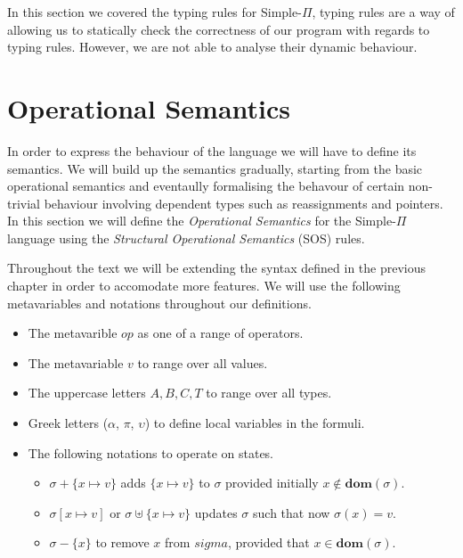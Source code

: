\documentclass[a4paper,12pt]{report}
\begin{document}
\par
In this section we covered the typing rules for Simple-$\Pi$, typing rules are a 
way of allowing us to statically check the correctness of our program with 
regards to typing rules. However, we are not able to analyse their dynamic 
behaviour. 

\newpage 

\section{Operational Semantics}
In order to express the behaviour of the language we will have to define its semantics. 
We will build up the semantics gradually, starting from the basic 
operational semantics and eventaully formalising the behavour of certain 
non-trivial behaviour involving dependent types such as reassignments and 
pointers. In this section we will define the \textit{Operational Semantics} 
\cite{operationalSemantics} for the Simple-$\Pi$ language 
using the \textit{Structural Operational Semantics} \cite{plotkinSOS} (SOS) rules.

\par
Throughout the text we will be extending the syntax defined in the 
previous chapter in order to accomodate more features. 
We will use the following metavariables and notations throughout our 
definitions.

\renewcommand\labelitemii{$\blacksquare$}
\begin{itemize}
  \item The metavarible $op$ as one of a range of operators. 
  \item The metavariable $v$ to range over all values.
  \item The uppercase letters $A,B,C,T$ to range over all types.
  \item Greek letters ($\alpha$, $\pi$, $\upsilon$) to define local variables in 
  the formuli. 
  \item The following notations to operate on states. 
    \begin{itemize}
      \item $\sigma + \{x \mapsto v\}$ adds $\{x \mapsto v\}$ to $\sigma$ provided initially $x \notin\textbf{dom}(\sigma)$. 
      \item $\sigma[x \mapsto v]$ or $\sigma \uplus \{x \mapsto v\}$ updates $\sigma$ such that now $\sigma(x) = v$.
      \item $\sigma - \{x\}$ to remove $x$ from $sigma$, provided that $x \in \textbf{dom}(\sigma)$.
    \end{itemize}
\end{itemize}
    
\end{document}
